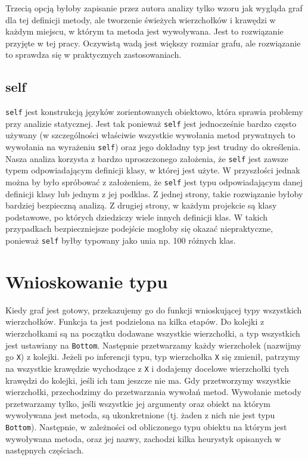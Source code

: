 \documentclass[declaration,shortabstract]{iithesis}
\begin{document}
Trzecią opcją byłoby zapisanie przez autora analizy tylko wzoru jak wygląda graf dla tej definicji metody, ale tworzenie świeżych wierzchołków i krawędzi w każdym miejscu, w którym ta metoda jest wywoływana. Jest to rozwiązanie przyjęte w tej pracy. Oczywistą wadą jest większy rozmiar grafu, ale rozwiązanie to sprawdza się w praktycznych zastosowaniach.

\subsection{self}

\texttt{self} jest konstrukcją języków zorientowanych obiektowo, która sprawia problemy przy analizie statycznej.
Jest tak ponieważ \texttt{self} jest jednocześnie bardzo często używany (w szczególności właściwie wszystkie wywołania metod prywatnych to wywołania na wyrażeniu \texttt{self}) oraz jego dokładny typ jest trudny do określenia. Nasza analiza korzysta z bardzo uproszczonego założenia, że \texttt{self} jest zawsze typem odpowiadającym definicji klasy, w której jest użyte. W przyszłości jednak można by było spróbować z założeniem, że \texttt{self} jest typu odpowiadającym danej definicji klasy lub jednym z jej podklas. Z jednej strony, takie rozwiązanie byłoby bardziej bezpieczną analizą. Z drugiej strony, w każdym projekcie są klasy podstawowe, po których dziedziczy wiele innych definicji klas. W takich przypadkach bezpieczniejsze podejście mogłoby się okazać niepraktyczne, ponieważ \texttt{self} byłby typowany jako unia np. 100 różnych klas.


\section{Wnioskowanie typu}

Kiedy graf jest gotowy, przekazujemy go do funkcji wnioskującej typy wszystkich wierzchołków. Funkcja ta jest podzielona na kilka etapów.
Do kolejki z wierzchołkami są na początku dodawane wszystkie wierzchołki, a typ wszystkich jest ustawiany na \texttt{Bottom}.
Następnie przetwarzamy każdy wierzchołek (nazwijmy go \texttt{X}) z kolejki.
Jeżeli po inferencji typu, typ wierzchołka \texttt{X} się zmienił, patrzymy na wszystkie krawędzie wychodzące z \texttt{X} i dodajemy docelowe wierzchołki tych krawędzi do kolejki, jeśli ich tam jeszcze nie ma.
Gdy przetworzymy wszystkie wierzchołki, przechodzimy do przetwarzania wywołań metod.
Wywołanie metody przetwarzamy tylko, jeśli wszystkie jej argumenty oraz obiekt na którym wywoływana jest metoda, są ukonkretnione (tj. żaden z nich nie jest typu \texttt{Bottom}).
Następnie, w zależności od obliczonego typu obiektu na którym jest wywoływana metoda, oraz jej nazwy, zachodzi kilka heurystyk opisanych w następnych częściach.
\end{document}
